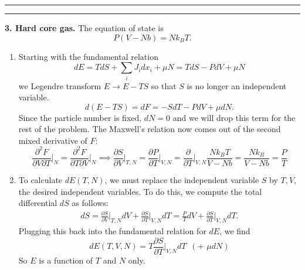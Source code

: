 \documentclass{article}
\theoremstyle{definition}
\newcommand{\p}{\partial}
\newcommand{\f}[2]{\frac{#1}{#2}}
\begin{document}
\hrule
\hrule

$\,$\\


\noindent \textbf{3. Hard core gas.} The equation of state is 
\begin{equation*}
P(V-Nb) = Nk_B T.
\end{equation*}

\begin{enumerate}[label=(\alph*)]
	\item Starting with the fundamental relation
	\begin{equation*}
	dE = TdS + \sum_i J_i dx_i + \mu N = TdS - PdV + \mu N
	\end{equation*}
	we Legendre transform $E \to E - TS$ so that $S$ is no longer an independent variable. 
	\begin{equation*}
	d(E-TS) = dF = -SdT -PdV + \mu dN.
	\end{equation*}
	Since the particle number is fixed, $dN=0$ and we will drop this term for the rest of the problem. The Maxwell's relation now comes out of the second mixed derivative of $F$:
	\begin{equation*}
	\f{\p^2 F}{\p V \p T}\bigg\vert_{N} = \f{\p^2 F}{\p T \p V}\bigg\vert_{N} \implies \boxed{\f{\p S}{\p V}\bigg\vert_{T,N}} = \f{\p P}{\p T}\bigg\vert_{V,N} = \f{\p}{\p T}\bigg\vert_{V,N} \f{Nk_BT}{V-Nb} = \boxed{\f{Nk_B}{V-Nb}} = \boxed{\f{P}{T}}
	\end{equation*}
	
	
	\item To calculate $dE(T,N)$, we must replace the independent variable $S$ by $T,V$, the desired independent variables. To do this, we compute the total differential $dS$ as follows:
	\begin{align*}
	dS = \f{\p S}{\p V}\bigg\vert_{T,N} dV + \f{\p S}{\p T}\bigg\vert_{V,N} dT = \f{P}{T}dV + \f{\p S}{\p T}\bigg\vert_{V,N} dT.
	\end{align*}
	Plugging this back into the fundamental relation for $dE$, we find 
	\begin{equation*}
	\boxed{dE(T,V,N) = T \f{\p S}{\p T}\bigg\vert_{V,N}dT \,\,\,(+ \,\,\mu dN)}
	\end{equation*}
	So $E$ is a function of $T$ and $N$ only. 
	

\end{enumerate}
\end{document}
